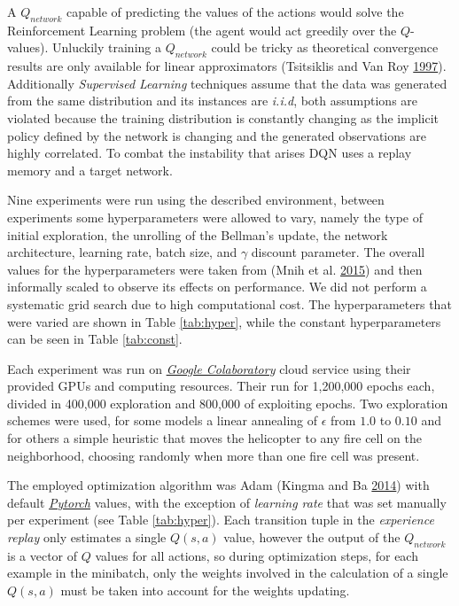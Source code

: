 \documentclass[
  openany]{book}
\begin{document}
A \(Q_{network}\) capable of predicting the values of the actions would solve the Reinforcement Learning problem (the agent would act greedily over the \(Q\)-values). Unluckily training a \(Q_{network}\) could be tricky as theoretical convergence results are only available for linear approximators (Tsitsiklis and Van Roy \protect\hyperlink{ref-tsitsiklis1997analysis}{1997}). Additionally \emph{Supervised Learning} techniques assume that the data was generated from the same distribution and its instances are \emph{i.i.d}, both assumptions are violated because the training distribution is constantly changing as the implicit policy defined by the network is changing and the generated observations are highly correlated. To combat the instability that arises DQN uses a replay memory and a target network.

Nine experiments were run using the described environment, between experiments some hyperparameters were allowed to vary, namely the type of initial exploration, the unrolling of the Bellman's update, the network architecture, learning rate, batch size, and \(\gamma\) discount parameter. The overall values for the hyperparameters were taken from (Mnih et al. \protect\hyperlink{ref-mnih2015human}{2015}) and then informally scaled to observe its effects on performance. We did not perform a systematic grid search due to high computational cost. The hyperparameters that were varied are shown in Table \ref{tab:hyper}, while the constant hyperparameters can be seen in Table \ref{tab:const}.

Each experiment was run on \emph{\href{https://colab.research.google.com}{Google Colaboratory}} cloud service using their provided GPUs and computing resources. Their run for 1,200,000 epochs each, divided in 400,000 exploration and 800,000 of exploiting epochs. Two exploration schemes were used, for some models a linear annealing of \(\epsilon\) from \(1.0\) to \(0.10\) and for others a simple heuristic that moves the helicopter to any fire cell on the neighborhood, choosing randomly when more than one fire cell was present.

The employed optimization algorithm was Adam (Kingma and Ba \protect\hyperlink{ref-kingma2014adam}{2014}) with default \emph{\href{https://pytorch.org/docs/stable/optim.html}{Pytorch}} values, with the exception of \emph{learning rate} that was set manually per experiment (see Table \ref{tab:hyper}). Each transition tuple in the \emph{experience replay} only estimates a single \(Q(s,a)\) value, however the output of the \(Q_{network}\) is a vector of \(Q\) values for all actions, so during optimization steps, for each example in the minibatch, only the weights involved in the calculation of a single \(Q(s,a)\) must be taken into account for the weights updating.
\end{document}
